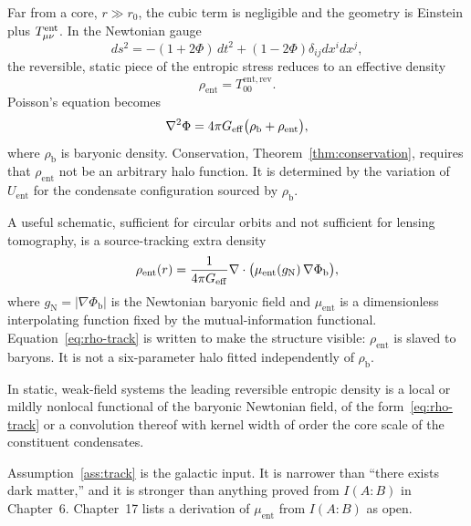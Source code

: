 Far from a core, \(r\gg r_0\), the cubic term is negligible and
the geometry is Einstein plus \(T^{\mathrm{ent}}_{\mu\nu}\). In the Newtonian
gauge
\begin{equation}
  \label{eq:newton-gauge}
  ds^2
  =-(1+2\Phi)\,dt^2
   +(1-2\Phi)\delta_{ij}dx^i dx^j,
\end{equation}
the reversible, static piece of the entropic stress reduces to an
effective density
\begin{equation}
  \label{eq:rho-ent}
  \rho_{\mathrm{ent}}
  =T_{00}^{\mathrm{ent,rev}}.
\end{equation}
Poisson's equation becomes
\begin{equation}
  \label{eq:poisson}
  \nabla^2\Phi
  =4\pi G_{\mathrm{eff}}
   \bigl(\rho_{\mathrm{b}}+\rho_{\mathrm{ent}}\bigr),
\end{equation}
where \(\rho_{\mathrm{b}}\) is baryonic density. Conservation,
Theorem~\ref{thm:conservation}, requires that \(\rho_{\mathrm{ent}}\)
not be an arbitrary halo function. It is determined by the
variation of \(U_{\mathrm{ent}}\) for the condensate configuration
sourced by \(\rho_{\mathrm{b}}\).

A useful schematic, sufficient for circular orbits and not
sufficient for lensing tomography, is a source-tracking extra
density
\begin{equation}
  \label{eq:rho-track}
  \rho_{\mathrm{ent}}(r)
  =\frac{1}{4\pi G_{\mathrm{eff}}}
   \nabla\cdot
   \bigl(
     \mu_{\mathrm{ent}}(g_{\mathrm{N}})\,\nabla\Phi_{\mathrm{b}}
   \bigr),
\end{equation}
where \(g_{\mathrm{N}}=|\nabla\Phi_{\mathrm{b}}|\) is the Newtonian
baryonic field and \(\mu_{\mathrm{ent}}\) is a dimensionless
interpolating function fixed by the mutual-information functional.
Equation~\eqref{eq:rho-track} is written to make the structure
visible: \(\rho_{\mathrm{ent}}\) is slaved to baryons. It is not a
six-parameter halo fitted independently of \(\rho_{\mathrm{b}}\).

\begin{assumption}
  \label{ass:track}
  In static, weak-field systems the leading reversible entropic
  density is a local or mildly nonlocal functional of the baryonic
  Newtonian field, of the form~\eqref{eq:rho-track} or a convolution
  thereof with kernel width of order the core scale of the
  constituent condensates.
\end{assumption}

Assumption~\ref{ass:track} is the galactic input. It is narrower
than ``there exists dark matter,'' and it is stronger than anything
proved from \(I(A:B)\) in Chapter~6. Chapter~17 lists a derivation
of \(\mu_{\mathrm{ent}}\) from \(I(A:B)\) as open.

